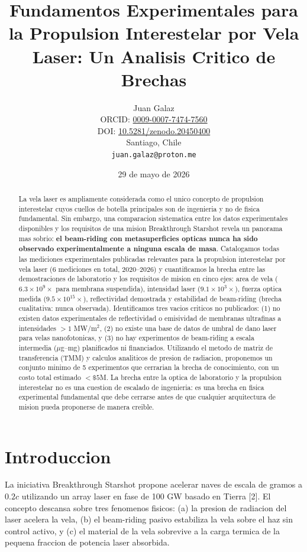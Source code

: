 \documentclass[11pt,a4paper,onecolumn]{article}
\title{{\bfseries Fundamentos Experimentales para la Propulsion Interestelar por Vela Laser: Un Analisis Critico de Brechas}}
\author{Juan Galaz\\[2mm]
\small ORCID: \href{https://orcid.org/0009-0007-7474-7560}{0009-0007-7474-7560}\\
\small DOI: \href{https://doi.org/10.5281/zenodo.20450400}{10.5281/zenodo.20450400}\\
\small Santiago, Chile\\
\small \texttt{juan.galaz@proton.me}}
\date{29 de mayo de 2026}
\begin{document}
\maketitle

\begin{abstract}
La vela laser es ampliamente considerada como el unico concepto de propulsion interestelar cuyos cuellos de botella principales son de ingenieria y no de fisica fundamental. Sin embargo, una comparacion sistematica entre los datos experimentales disponibles y los requisitos de una mision Breakthrough Starshot revela un panorama mas sobrio: \textbf{el beam-riding con metasuperficies opticas nunca ha sido observado experimentalmente a ninguna escala de masa}. Catalogamos todas las mediciones experimentales publicadas relevantes para la propulsion interestelar por vela laser (6 mediciones en total, 2020--2026) y cuantificamos la brecha entre las demostraciones de laboratorio y los requisitos de mision en cinco ejes: area de vela ($6.3\times10^{9}\times$ para membrana suspendida), intensidad laser ($9.1\times10^{3}\times$), fuerza optica medida ($9.5\times10^{15}\times$), reflectividad demostrada y estabilidad de beam-riding (brecha cualitativa: nunca observada). Identificamos tres vacios criticos no publicados: (1) no existen datos experimentales de reflectividad o emisividad de membranas ultrafinas a intensidades $>1$ MW/m$^2$, (2) no existe una base de datos de umbral de dano laser para velas nanofotonicas, y (3) no hay experimentos de beam-riding a escala intermedia ($\mu$g--mg) planificados ni financiados. Utilizando el metodo de matriz de transferencia (TMM) y calculos analiticos de presion de radiacion, proponemos un conjunto minimo de 5 experimentos que cerrarian la brecha de conocimiento, con un costo total estimado $<\$5$M. La brecha entre la optica de laboratorio y la propulsion interestelar no es una cuestion de escalado de ingenieria: es una brecha en fisica experimental fundamental que debe cerrarse antes de que cualquier arquitectura de mision pueda proponerse de manera creible.
\end{abstract}

\vspace{5mm}

\section{Introduccion}

La iniciativa Breakthrough Starshot propone acelerar naves de escala de gramos a $0.2c$ utilizando un array laser en fase de 100 GW basado en Tierra [2]. El concepto descansa sobre tres fenomenos fisicos: (a) la presion de radiacion del laser acelera la vela, (b) el beam-riding pasivo estabiliza la vela sobre el haz sin control activo, y (c) el material de la vela sobrevive a la carga termica de la pequena fraccion de potencia laser absorbida.
\end{document}

